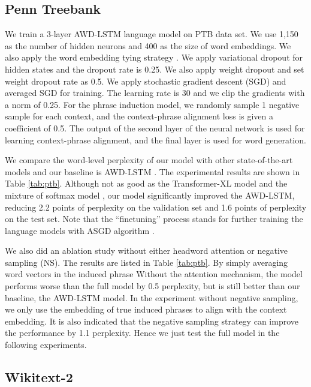\documentclass[11pt,a4paper]{article}
\begin{document}
\subsection{Penn Treebank}
We train a 3-layer AWD-LSTM language model \cite{merity2017regularizing} on PTB data set. We use 1,150 as the number of hidden neurons and 400 as the size of word embeddings. We also apply the word embedding tying strategy \cite{inan2016tying}. We apply variational dropout for hidden states \cite{gal2016theoretically} and the dropout rate is 0.25. We also apply weight dropout \cite{merity2017regularizing} and set weight dropout rate as 0.5. We apply stochastic gradient descent (SGD) and averaged SGD \citep[ASGD;][]{polyak1992acceleration} for training. The learning rate is 30 and we clip the gradients with a norm of 0.25. For the phrase induction model, we randomly sample 1 negative sample for each context, and the context-phrase alignment loss is given a coefficient of 0.5. The output of the second layer of the neural network is used for learning context-phrase alignment, and the final layer is used for word generation.

We compare the word-level perplexity of our model with other state-of-the-art models and our baseline is AWD-LSTM \cite{merity2017regularizing}.
The experimental results are shown in Table \ref{tab:ptb}. Although not as good as the Transformer-XL model \cite{dai2018transformer} and the mixture of softmax model \cite{yang2017breaking}, our model significantly improved the AWD-LSTM, reducing 2.2 points of perplexity on the validation set and 1.6 points of perplexity on the test set. Note that the ``finetuning'' process stands for further training the language models with ASGD algorithm \cite{merity2017regularizing}.

We also did an ablation study without either headword attention or negative sampling (NS). The  results are listed in Table \ref{tab:ptb}. By simply averaging word vectors in the induced phrase Without the attention mechanism, the model performs worse than the full model by 0.5 perplexity, but is still better than our baseline, the AWD-LSTM model. In the experiment without negative sampling, we only use the embedding of true induced phrases to align with the context embedding. It is also indicated that the negative sampling strategy can improve the performance by 1.1 perplexity. Hence we just test the full model in the following experiments.

\subsection{Wikitext-2}
\end{document}
